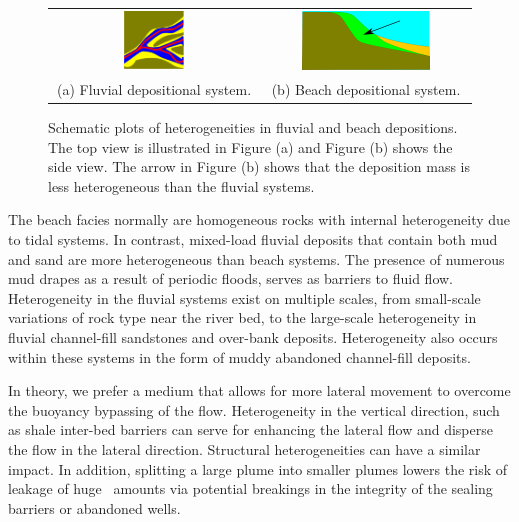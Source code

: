 \begin{figure}
\begin{tabular}{cc}
\includegraphics[width=0.3\textwidth]{./figurer/delta_fluvial}&
\includegraphics[width=0.65\textwidth]{./figurer/delta_beach}\\(a) Fluvial depositional system. &(b) Beach depositional system.
\end{tabular}
\caption{Schematic plots of heterogeneities in fluvial and beach depositions. The top view is illustrated in Figure (a) and Figure (b) shows the side view. The arrow in Figure (b) shows that the deposition mass is less heterogeneous than the fluvial systems.}
\label{fig:delta}
\end{figure}

The beach facies normally are homogeneous rocks with internal heterogeneity due to tidal systems. In contrast, mixed-load fluvial deposits that contain both mud and sand are more heterogeneous than beach systems. The presence of numerous mud drapes as a result of periodic floods, serves as barriers to fluid flow. Heterogeneity in the fluvial systems exist on multiple scales, from small-scale variations of rock type near the river bed, to the large-scale heterogeneity in fluvial channel-fill sandstones and over-bank deposits. Heterogeneity also occurs within these systems in the form of muddy abandoned channel-fill deposits.

In theory, we prefer a medium that allows for more lateral movement to overcome the buoyancy bypassing of the flow. Heterogeneity in the vertical direction, such as shale inter-bed barriers can serve for enhancing the lateral flow and disperse the flow in the lateral direction. Structural heterogeneities can have a similar impact. In addition, splitting a large plume into smaller plumes lowers the risk of leakage of huge \coo\ amounts via potential breakings in the integrity of the sealing barriers or abandoned wells.

